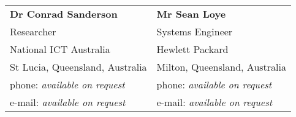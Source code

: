 \documentclass[margin,line]{resume}
\begin{document}
\begin{resume}
\begin{tabular}{@{}p{6cm}p{6cm}}
\textbf{Dr Conrad Sanderson}            &  \textbf{Mr Sean Loye}                    \\
Researcher                              &  Systems Engineer                         \\
National ICT Australia                  &  Hewlett Packard                          \\
St Lucia, Queensland, Australia         &  Milton, Queensland, Australia            \\
phone: \textsl{available on request}    &  phone: \textsl{available on request}     \\
e-mail: \textsl{available on request}   &  e-mail: \textsl{available on request}    \\
\end{tabular}



\end{resume}
\end{document}
